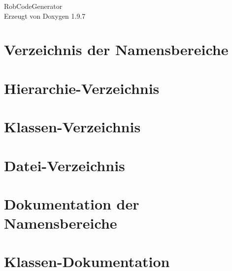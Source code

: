 \documentclass[twoside]{book}
\newcommand{\+}{\discretionary{\mbox{\scriptsize$\hookleftarrow$}}{}{}}
\newcommand{\clearemptydoublepage}{%
    \newpage{\pagestyle{empty}\cleardoublepage}%
  }
\begin{document}
  \raggedbottom
    \hypersetup{pageanchor=false,
                bookmarksnumbered=true,
                pdfencoding=unicode
               }
  \begin{titlepage}
  \vspace*{7cm}
  \begin{center}%
  {\Large Rob\+Code\+Generator}\\
  \vspace*{1cm}
  {\large Erzeugt von Doxygen 1.9.7}\\
  \end{center}
  \end{titlepage}
  \clearemptydoublepage
  \tableofcontents
  \clearemptydoublepage
  \hypersetup{pageanchor=true}

\chapter{Verzeichnis der Namensbereiche}

\chapter{Hierarchie-\/\+Verzeichnis}

\chapter{Klassen-\/\+Verzeichnis}

\chapter{Datei-\/\+Verzeichnis}

\chapter{Dokumentation der Namensbereiche}


\chapter{Klassen-\/\+Dokumentation}
















\end{document}
